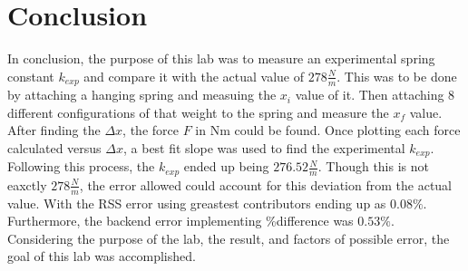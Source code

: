\chapter{Conclusion}

In conclusion, the purpose of this lab was to measure an experimental spring 
constant $k_{exp}$ and compare it with the actual value of $278 \frac{N}{m}$. This was to be done 
by attaching a hanging spring and measuing the $x_i$ value of it. Then attaching
8 different configurations of that weight to the spring and measure the $x_f$
value. After finding the $\Delta x$, the force $F$ in Nm could be found.
Once plotting each force calculated versus $\Delta x$, a best fit slope was 
used to find the experimental $k_{exp}$.\\

\noindent Following this process, the $k_{exp}$ ended up being $276.52 \frac{N}{m}$. Though this is not
eaxctly $278 \frac {N}{m}$, the error allowed could account for this deviation from the actual
value. With the RSS error using greastest contributors ending up as $0.08\%$.\\

\noindent Furthermore, the backend error implementing \%difference was $0.53\%$.\\

\noindent Considering the purpose of the lab, the result, and factors of possible error,
the goal of this lab was accomplished.
